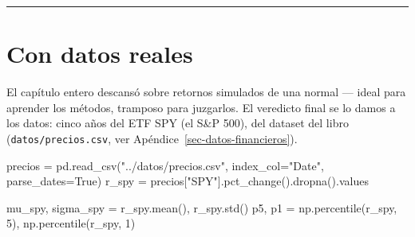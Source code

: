 \documentclass[
  spanish,
  letterpaper,
  DIV=11,
  numbers=noendperiod]{scrreprt}
\newenvironment{Shaded}{\begin{snugshade}}{\end{snugshade}}
\newcommand{\DecValTok}[1]{\textcolor[rgb]{0.68,0.00,0.00}{#1}}
\newcommand{\NormalTok}[1]{\textcolor[rgb]{0.00,0.23,0.31}{#1}}
\newcommand{\OperatorTok}[1]{\textcolor[rgb]{0.37,0.37,0.37}{#1}}
\newcommand{\StringTok}[1]{\textcolor[rgb]{0.13,0.47,0.30}{#1}}
\newcommand{\VariableTok}[1]{\textcolor[rgb]{0.07,0.07,0.07}{#1}}
\begin{document}
\begin{center}\rule{0.5\linewidth}{0.5pt}\end{center}

\chapter{Con datos reales}\label{con-datos-reales-2}

El capítulo entero descansó sobre retornos simulados de una normal ---
ideal para aprender los métodos, tramposo para juzgarlos. El veredicto
final se lo damos a los datos: cinco años del ETF SPY (el S\&P 500), del
dataset del libro (\texttt{datos/precios.csv}, ver
Apéndice~\ref{sec-datos-financieros}).

\label{var-datos-reales}
\begin{Shaded}
\begin{Highlighting}[]
\NormalTok{precios }\OperatorTok{=}\NormalTok{ pd.read\_csv(}\StringTok{"../datos/precios.csv"}\NormalTok{, index\_col}\OperatorTok{=}\StringTok{"Date"}\NormalTok{, parse\_dates}\OperatorTok{=}\VariableTok{True}\NormalTok{)}
\NormalTok{r\_spy }\OperatorTok{=}\NormalTok{ precios[}\StringTok{"SPY"}\NormalTok{].pct\_change().dropna().values}

\NormalTok{mu\_spy, sigma\_spy }\OperatorTok{=}\NormalTok{ r\_spy.mean(), r\_spy.std()}
\NormalTok{p5, p1 }\OperatorTok{=}\NormalTok{ np.percentile(r\_spy, }\DecValTok{5}\NormalTok{), np.percentile(r\_spy, }\DecValTok{1}\NormalTok{)}


\end{Highlighting}
\end{Shaded}
\end{document}
